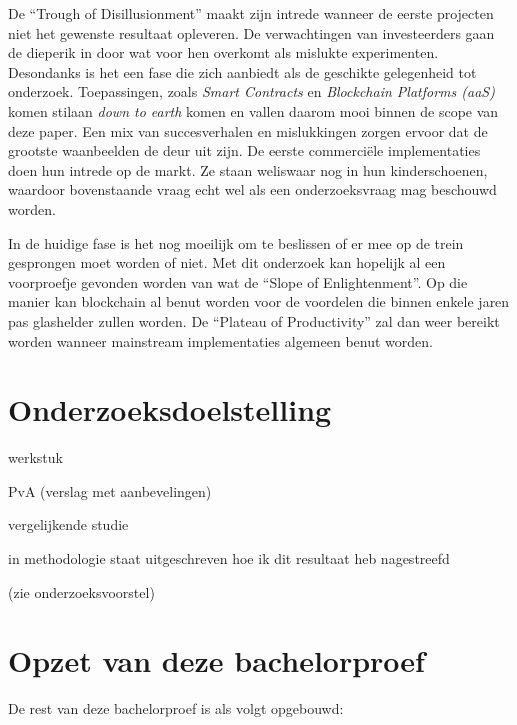 De ``Trough of Disillusionment'' maakt zijn intrede wanneer de eerste projecten niet het gewenste resultaat opleveren.
De verwachtingen van investeerders gaan de dieperik in door wat voor hen overkomt als mislukte experimenten. Desondanks is het een fase die zich aanbiedt als de geschikte gelegenheid tot onderzoek. Toepassingen, zoals \textit{Smart Contracts} en \textit{Blockchain Platforms (aaS)} komen stilaan \textit{down to earth} komen en vallen daarom mooi binnen de scope van deze paper. Een mix van succesverhalen en mislukkingen zorgen ervoor dat de grootste waanbeelden de deur uit zijn. De eerste commerciële implementaties doen hun intrede op de markt. Ze staan weliswaar nog in hun kinderschoenen, waardoor bovenstaande vraag echt wel als een onderzoeksvraag mag beschouwd worden. 

In de huidige fase is het nog moeilijk om te beslissen of er mee op de trein gesprongen moet worden of niet. Met dit onderzoek kan hopelijk al een voorproefje gevonden worden van wat de ``Slope of Enlightenment''. Op die manier kan blockchain al benut worden voor de voordelen die binnen enkele jaren pas glashelder zullen worden. De ``Plateau of Productivity'' zal dan weer bereikt worden wanneer mainstream implementaties algemeen benut worden.



\section{Onderzoeksdoelstelling}
\label{sec:onderzoeksdoelstelling}

werkstuk

PvA (verslag met aanbevelingen)

vergelijkende studie

in methodologie staat uitgeschreven hoe ik dit resultaat heb nagestreefd

(zie onderzoeksvoorstel)




\section{Opzet van deze bachelorproef}
\label{sec:opzet-bachelorproef}


De rest van deze bachelorproef is als volgt opgebouwd:

